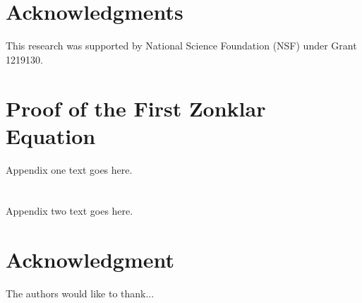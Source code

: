 \documentclass[journal]{IEEEtran}
\begin{document}
\section*{Acknowledgments}
This research was supported by National Science Foundation (NSF) under Grant 1219130.
 


\appendices
\section{Proof of the First Zonklar Equation}
Appendix one text goes here.

\section{}
Appendix two text goes here.


\section*{Acknowledgment}


The authors would like to thank...


\ifCLASSOPTIONcaptionsoff
  \newpage
\fi



\end{document}
